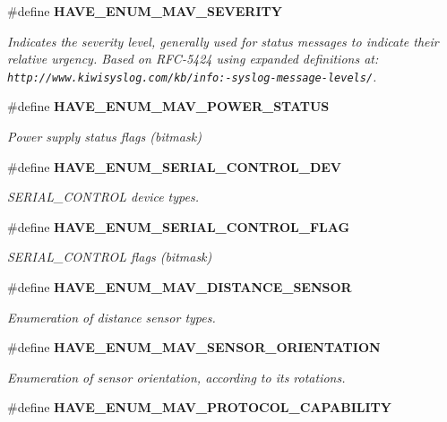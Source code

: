 \begin{DoxyCompactItemize}
\#define \textbf{ H\+A\+V\+E\+\_\+\+E\+N\+U\+M\+\_\+\+M\+A\+V\+\_\+\+S\+E\+V\+E\+R\+I\+TY}
\begin{DoxyCompactList}\small\item\em Indicates the severity level, generally used for status messages to indicate their relative urgency. Based on R\+F\+C-\/5424 using expanded definitions at\+: {\tt http\+://www.\+kiwisyslog.\+com/kb/info\+:-\/syslog-\/message-\/levels/}. \end{DoxyCompactList}\item 
\#define \textbf{ H\+A\+V\+E\+\_\+\+E\+N\+U\+M\+\_\+\+M\+A\+V\+\_\+\+P\+O\+W\+E\+R\+\_\+\+S\+T\+A\+T\+US}
\begin{DoxyCompactList}\small\item\em Power supply status flags (bitmask) \end{DoxyCompactList}\item 
\#define \textbf{ H\+A\+V\+E\+\_\+\+E\+N\+U\+M\+\_\+\+S\+E\+R\+I\+A\+L\+\_\+\+C\+O\+N\+T\+R\+O\+L\+\_\+\+D\+EV}
\begin{DoxyCompactList}\small\item\em S\+E\+R\+I\+A\+L\+\_\+\+C\+O\+N\+T\+R\+OL device types. \end{DoxyCompactList}\item 
\#define \textbf{ H\+A\+V\+E\+\_\+\+E\+N\+U\+M\+\_\+\+S\+E\+R\+I\+A\+L\+\_\+\+C\+O\+N\+T\+R\+O\+L\+\_\+\+F\+L\+AG}
\begin{DoxyCompactList}\small\item\em S\+E\+R\+I\+A\+L\+\_\+\+C\+O\+N\+T\+R\+OL flags (bitmask) \end{DoxyCompactList}\item 
\#define \textbf{ H\+A\+V\+E\+\_\+\+E\+N\+U\+M\+\_\+\+M\+A\+V\+\_\+\+D\+I\+S\+T\+A\+N\+C\+E\+\_\+\+S\+E\+N\+S\+OR}
\begin{DoxyCompactList}\small\item\em Enumeration of distance sensor types. \end{DoxyCompactList}\item 
\#define \textbf{ H\+A\+V\+E\+\_\+\+E\+N\+U\+M\+\_\+\+M\+A\+V\+\_\+\+S\+E\+N\+S\+O\+R\+\_\+\+O\+R\+I\+E\+N\+T\+A\+T\+I\+ON}
\begin{DoxyCompactList}\small\item\em Enumeration of sensor orientation, according to its rotations. \end{DoxyCompactList}\item 
\#define \textbf{ H\+A\+V\+E\+\_\+\+E\+N\+U\+M\+\_\+\+M\+A\+V\+\_\+\+P\+R\+O\+T\+O\+C\+O\+L\+\_\+\+C\+A\+P\+A\+B\+I\+L\+I\+TY}

\end{DoxyCompactItemize}
